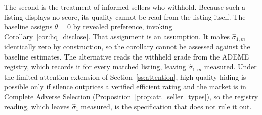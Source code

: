 The second is the treatment of informed sellers who withhold. Because such a listing displays
no score, its quality cannot be read from the listing itself. The baseline assigns
$\theta=0$ by revealed preference, invoking Corollary~\ref{cor:hq_disclose}. That assignment
is an assumption. It makes
$\hat\sigma_{1,m}$ identically zero by construction, so the corollary cannot be assessed
against the baseline estimates. The alternative reads the withheld grade from the ADEME
registry, which records it for every matched listing, leaving $\hat\sigma_{1,m}$ measured. Under the limited-attention extension of Section~\ref{ss:attention}, high-quality hiding is possible only if silence outprices a verified efficient rating and the market is in Complete Adverse Selection (Proposition~\ref{prop:att_seller_types}), so the registry reading, which leaves $\hat\sigma_1$ measured, is the specification that does not rule it out.
